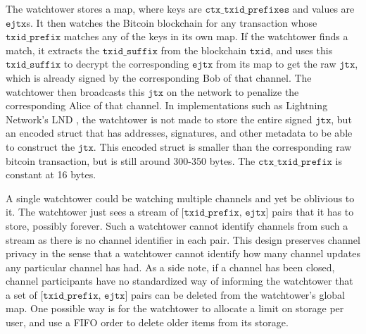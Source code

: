 The watchtower stores a map, where keys are $\texttt{ctx\_txid\_prefixes}$ and values are $\texttt{ejtx}$s. It then watches the Bitcoin blockchain for any transaction whose $\texttt{txid\_prefix}$ matches any of the keys in its own map. If the watchtower finds a match, it extracts the $\texttt{txid\_suffix}$ from the blockchain $\texttt{txid}$, and uses this $\texttt{txid\_suffix}$ to decrypt the corresponding $\texttt{ejtx}$ from its map to get the raw $\texttt{jtx}$, which is already signed by the corresponding Bob of that channel. The watchtower then broadcasts this $\texttt{jtx}$ on the network to penalize the corresponding Alice of that channel. In implementations such as Lightning Network's LND \cite{lnd}, the watchtower is not made to store the entire signed $\texttt{jtx}$, but an encoded struct that has addresses, signatures, and other metadata to be able to construct the $\texttt{jtx}$. This encoded struct is smaller than the corresponding raw bitcoin transaction, but is still around 300-350 bytes. The $\texttt{ctx\_txid\_prefix}$ is constant at 16 bytes.

A single watchtower could be watching multiple channels and yet be oblivious to it. The watchtower just sees a stream of \sloppy $\texttt{[txid\_prefix, ejtx]}$ pairs that it has to store, possibly forever. Such a watchtower cannot identify channels from such a stream as there is no channel identifier in each pair. This design preserves channel privacy in the sense that a watchtower cannot identify how many channel updates any particular channel has had. As a side note, if a channel has been closed, channel participants have no standardized way of informing the watchtower that a set of $\texttt{[txid\_prefix, ejtx]}$ pairs can be deleted from the watchtower's global map. One possible way is for the watchtower to allocate a limit on storage per user, and use a FIFO order to delete older items from its storage.

